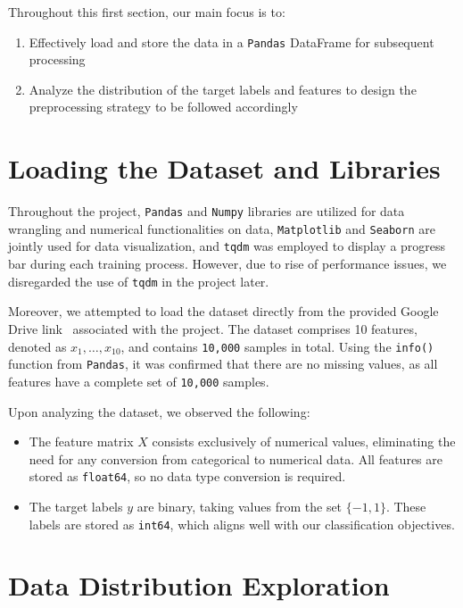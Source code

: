 
Throughout this first section, our main focus is to:
\begin{enumerate}
    \item Effectively load and store the data in a \texttt{Pandas} DataFrame for subsequent processing
    \item Analyze the distribution of the target labels and features to design the preprocessing strategy to be followed accordingly
\end{enumerate}

\section{Loading the Dataset and Libraries}

Throughout the project, \texttt{Pandas} and \texttt{Numpy} libraries are utilized for data wrangling and numerical functionalities on data, \texttt{Matplotlib} and \texttt{Seaborn} are jointly used for data visualization, and \texttt{tqdm} was employed to display a progress bar during each training process. However, due to rise of performance issues, we disregarded the use of \texttt{tqdm} in the project later.

Moreover, we attempted to load the dataset directly from the provided Google Drive link~\cite{dataset} associated with the project. The dataset comprises 10 features, denoted as $x_1, \dots, x_{10}$, and contains \texttt{10,000} samples in total. Using the \texttt{info()} function from \texttt{Pandas}, it was confirmed that there are no missing values, as all features have a complete set of \texttt{10,000} samples.

Upon analyzing the dataset, we observed the following:
\begin{itemize}
    \item The feature matrix $X$ consists exclusively of numerical values, eliminating the need for any conversion from categorical to numerical data. All features are stored as \texttt{float64}, so no data type conversion is required.
    \item The target labels $y$ are binary, taking values from the set $\{-1, 1\}$. These labels are stored as \texttt{int64}, which aligns well with our classification objectives.
\end{itemize}

\section{Data Distribution Exploration}

